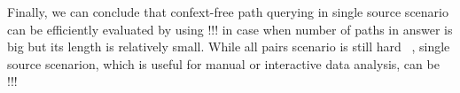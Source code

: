 Finally, we can conclude that confext-free path querying in single source scenario can be efficiently evaluated by using !!! in case when number of paths in answer is big but its length is relatively small. While all pairs scenario is still hard ~\cite{!!!}, single source scenarion, which is useful for manual or interactive data analysis, can be !!!
